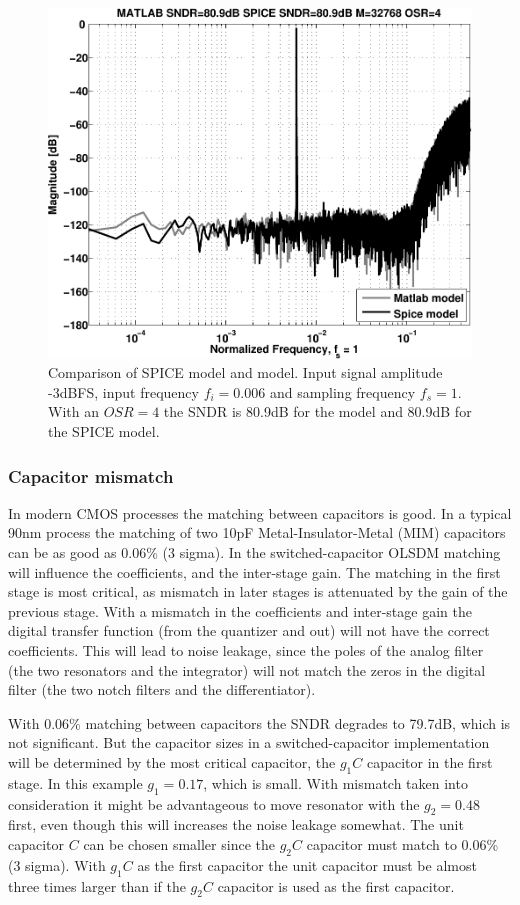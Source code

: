 \begin{figure}[htbp]
\centerline{ \includegraphics[width=\myfigwidth]{graphics/osdr21_spice}}
  \caption{Comparison of SPICE model and \matlab model. Input signal amplitude -3dBFS, input frequency $f_i =
    0.006$ and sampling frequency $f_s = 1$. With an $OSR=4$ the
    SNDR is 80.9dB for the \matlab model and 80.9dB for the
    SPICE model.}
  \label{sdrfig:fifthordersdm}
\end{figure}

\subsubsection{Capacitor mismatch}
In modern CMOS processes the matching between capacitors is good. In a
typical 90nm process the matching of two 10pF Metal-Insulator-Metal
(MIM) capacitors can be as good as 0.06\% (3 sigma). In the
switched-capacitor OLSDM matching will influence the coefficients, and
the inter-stage gain. The matching in the first stage is most critical,
as mismatch in later stages is attenuated by the gain of the previous
stage. With a mismatch in the coefficients and inter-stage gain the
digital transfer function (from the quantizer and out) will not have
the correct coefficients. This will lead to noise
leakage, since the poles of the analog filter (the two resonators and
the integrator) will not match the zeros in the digital filter (the
two notch filters and the differentiator). 

With 0.06\% matching between capacitors the SNDR degrades to 79.7dB, which is not
significant. But the capacitor sizes in a switched-capacitor
implementation will be determined by the most critical capacitor, the
$g_1C$ capacitor in the first stage. In this example $g_1 = 0.17$,
which is small. With mismatch taken into consideration it might be
advantageous to move resonator with the $g_2 = 0.48$ first, even
though this will increases the noise leakage somewhat. The unit capacitor
$C$ can be chosen smaller since the $g_2C$ capacitor must match to
0.06\% (3 sigma). With $g_1C$ as the first capacitor the unit capacitor must be
almost three times larger than if the $g_2C$ capacitor is used as the
first capacitor.

